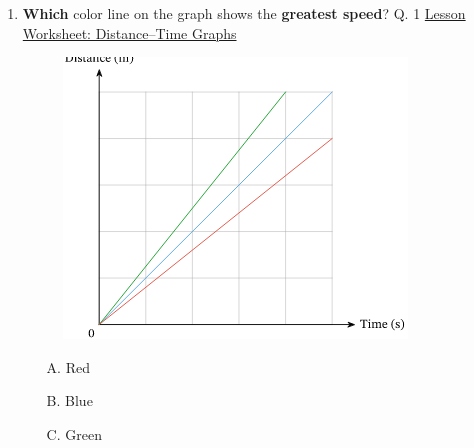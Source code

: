 \documentclass[A4,12pt]{article}
\begin{document}
\begin{enumerate}[label=\bfseries (\arabic*)]
\item \textbf{Which} color line on the graph shows the \textbf{greatest speed}? \cite{Nagwa} Q. 1 \href{https://www.nagwa.com/en/worksheets/964158724874/}{Lesson Worksheet: Distance–Time Graphs}
%
\begin{figure}[H]
    \centering
    \includegraphics{Nagwa_Q1_kin.png}
    \caption{}
    \label{fig:my_label}
\end{figure}
%
\begin{multicols}{3}
\begin{itemize}
    \item[A.] Red
    \item[B.] Blue
    \item[C.] Green
\end{itemize}
\end{multicols}









































\end{enumerate}
\end{document}
